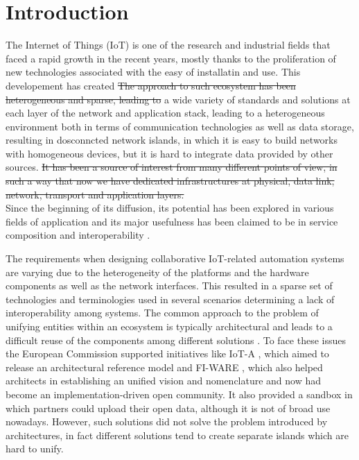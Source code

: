 \section{Introduction}
The Internet of Things (IoT) is one of the research and industrial fields that faced a rapid growth in the recent years, mostly thanks to the proliferation of new technologies associated with the easy of installatin and use. This developement has created \st{The approach to such ecosystem has been heterogeneous and sparse, leading to} a wide variety of standards and solutions at each layer of the network and application stack, leading to a heterogeneous environment both in terms of communication technologies as well as data storage, resulting in dosconncted network islands, in which it is easy to build networks with homogeneous devices, but it is hard to integrate data provided by other sources.
\st{It has been a source of interest from many different points of view, in such a way that now we have dedicated infrastructures at physical, data link, network, transport and application layers.}
\\

Since the beginning of its diffusion, its potential has been explored in various fields of application and its major usefulness has been claimed to be in service composition and interoperability \cite{atzori2010internet}.

The requirements when designing collaborative IoT-related automation systems are varying due to the heterogeneity of the platforms and the hardware components as well as the network interfaces.
This resulted in a sparse set of technologies and terminologies used in several scenarios determining a lack of interoperability among systems.
The common approach to the problem of unifying entities within an ecosystem is typically architectural and leads to a difficult reuse of the components among different solutions \cite{krco2014designing}.
To face these issues the European Commission supported initiatives like IoT-A \cite{iot-a}, which aimed to release an architectural reference model and FI-WARE \cite{fiware}, which also helped architects in establishing an unified vision and nomenclature and now had become an implementation-driven open community.
It also provided a sandbox in which partners could upload their open data, although it is not of broad use nowadays.
However, such solutions did not solve the problem introduced by architectures, in fact different solutions tend to create separate islands which are hard to unify.

